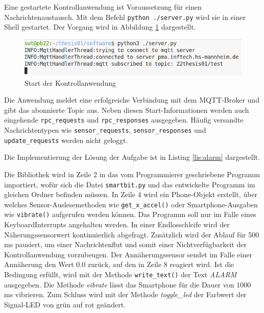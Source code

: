 \documentclass[11pt,a4paper]{report}
\begin{document}
Eine gestartete Kontrollanwendung ist Voraussetzung für einen Nachrichtenaustausch.
Mit dem Befehl \texttt{python ./server.py} wird sie in einer Shell gestartet.
Der Vorgang wird in Abbildung \ref{fig:start_controll_app} dargestellt.
\begin{figure}[htbp]
  \centering
  \includegraphics[width=.8\textwidth]{images/server_logging}
  \caption{Start der Kontrollanwendung}
  \label{fig:start_controll_app}
\end{figure}
Die Anwendung meldet eine erfolgreiche Verbindung mit dem MQTT-Broker und gibt das abonnierte Topic aus.
Neben diesen Start-Informationen werden auch eingehende \texttt{rpc\_requests} und \texttt{rpc\_responses} ausgegeben.
Häufig versandte Nachrichtentypen wie \texttt{sensor\_re\-quests}, \texttt{sensor\_responses} und \texttt{update\_requests} werden nicht geloggt.

Die Implementierung der Lösung der Aufgabe ist in Listing \ref{lis:alarm} dargestellt.
\lstset{language=python, captionpos=b, frame=single, numberstyle=\tiny, style=customcs}

Die Bibliothek wird in Zeile 2 in das vom Programmierer geschriebene Programm importiert, wofür sich die Datei \texttt{smartbit.py} und das entwickelte Programm im gleichen Ordner befinden müssen.
In Zeile 4 wird ein Phone-Objekt erstellt, über welches Sensor-Auslesemethoden wie \texttt{get\_x\_accel()} oder Smartphone-Ausgaben wie \texttt{vibrate()} aufgerufen werden können.
Das Programm soll nur im Falle eines KeyboardInterrupts angehalten werden.
In einer Endlosschleife wird der Näherungssensorwert kontinuierlich abgefragt.
Zusätzlich wird der Ablauf für 500 ms pausiert, um einer Nachrichtenflut und somit einer Nichtverfügbarkeit der Kontrollanwendung vorzubeugen.
Der Annäherungssensor sendet im Falle einer Annäherung den Wert 0.0 zurück, auf den in Zeile 8 reagiert wird.
Ist die Bedingung erfüllt, wird mit der Methode \texttt{write\_text()} der Text \textit{ALARM} ausgegeben.
Die Methode \textit{vibrate} lässt das Smartphone für die Dauer von 1000 ms vibrieren.
Zum Schluss wird mit der Methode \textit{toggle\_led} der Farbwert der Signal-LED von grün auf rot geändert.
\end{document}
